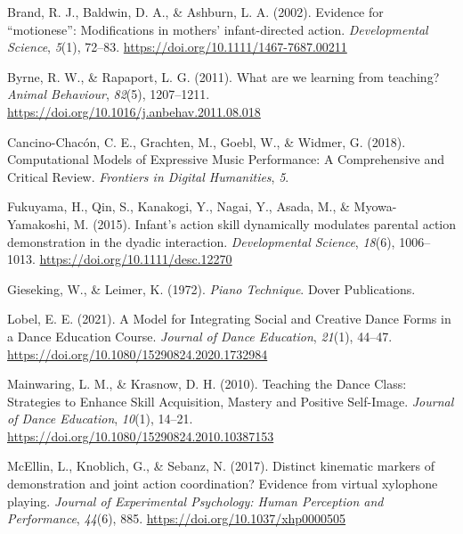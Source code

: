 \documentclass[
  man,floatsintext]{apa6}
\newlength{\cslhangindent}
\newlength{\cslentryspacingunit} %
\newenvironment{CSLReferences}[2] %
 {%
  \setlength{\parindent}{0pt}
  \ifodd #1
  \let\oldpar\par
  \def\par{\hangindent=\cslhangindent\oldpar}
  \fi
  \setlength{\parskip}{#2\cslentryspacingunit}
 }%
 {}
\begin{document}
\hypertarget{refs}{}
\begin{CSLReferences}{1}{0}
\leavevmode{}%
Brand, R. J., Baldwin, D. A., \& Ashburn, L. A. (2002). Evidence for {``motionese''}: Modifications in mothers' infant-directed action. \emph{Developmental Science}, \emph{5}(1), 72--83. \url{https://doi.org/10.1111/1467-7687.00211}

\leavevmode{}%
Byrne, R. W., \& Rapaport, L. G. (2011). What are we learning from teaching? \emph{Animal Behaviour}, \emph{82}(5), 1207--1211. \url{https://doi.org/10.1016/j.anbehav.2011.08.018}

\leavevmode{}%
Cancino-Chacón, C. E., Grachten, M., Goebl, W., \& Widmer, G. (2018). Computational {Models} of {Expressive Music Performance}: {A Comprehensive} and {Critical Review}. \emph{Frontiers in Digital Humanities}, \emph{5}.

\leavevmode{}%
Fukuyama, H., Qin, S., Kanakogi, Y., Nagai, Y., Asada, M., \& Myowa-Yamakoshi, M. (2015). Infant's action skill dynamically modulates parental action demonstration in the dyadic interaction. \emph{Developmental Science}, \emph{18}(6), 1006--1013. \url{https://doi.org/10.1111/desc.12270}

\leavevmode{}%
Gieseking, W., \& Leimer, K. (1972). \emph{Piano {Technique}}. {Dover Publications}.

\leavevmode{}%
Lobel, E. E. (2021). A {Model} for {Integrating Social} and {Creative Dance Forms} in a {Dance Education Course}. \emph{Journal of Dance Education}, \emph{21}(1), 44--47. \url{https://doi.org/10.1080/15290824.2020.1732984}

\leavevmode{}%
Mainwaring, L. M., \& Krasnow, D. H. (2010). Teaching the {Dance Class}: {Strategies} to {Enhance Skill Acquisition}, {Mastery} and {Positive Self-Image}. \emph{Journal of Dance Education}, \emph{10}(1), 14--21. \url{https://doi.org/10.1080/15290824.2010.10387153}

\leavevmode{}%
McEllin, L., Knoblich, G., \& Sebanz, N. (2017). Distinct kinematic markers of demonstration and joint action coordination? {Evidence} from virtual xylophone playing. \emph{Journal of Experimental Psychology: Human Perception and Performance}, \emph{44}(6), 885. \url{https://doi.org/10.1037/xhp0000505}


\end{CSLReferences}
\end{document}
